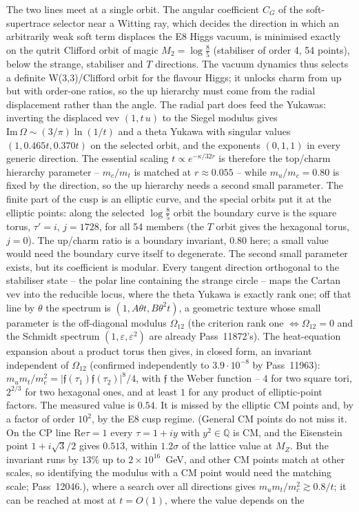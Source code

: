 The two lines meet at a single orbit. The angular coefficient $C_G$ of the soft-supertrace selector near a Witting ray, which decides the direction in which an arbitrarily weak soft term displaces the E8 Higgs vacuum, is minimised exactly on the qutrit Clifford orbit of magic $M_2=\log\tfrac85$ (stabiliser of order 4, 54 points), below the strange, stabiliser and $T$ directions. The vacuum dynamics thus selects a definite W(3,3)/Clifford orbit for the flavour Higgs; it unlocks charm from up but with order-one ratios, so the up hierarchy must come from the radial displacement rather than the angle.  The radial part does feed the Yukawas: inverting the displaced vev $(1,t\,u)$ to the Siegel modulus gives $\mathrm{Im}\,\Omega\sim(3/\pi)\ln(1/t)$ and a theta Yukawa with singular values $(1,0.465t,0.370t)$ on the selected orbit, and the exponents $(0,1,1)$ in every generic direction. The essential scaling $t\propto e^{-\kappa/32r}$ is therefore the top/charm hierarchy parameter -- $m_c/m_t$ is matched at $r\approx0.055$ -- while $m_u/m_c=0.80$ is fixed by the direction, so the up hierarchy needs a second small parameter.  The finite part of the cusp is an elliptic curve, and the special orbits put it at the elliptic points: along the selected $\log\tfrac85$ orbit the boundary curve is the square torus, $\tau'=i$, $j=1728$, for all 54 members (the $T$ orbit gives the hexagonal torus, $j=0$). The up/charm ratio is a boundary invariant, $0.80$ here; a small value would need the boundary curve itself to degenerate.  The second small parameter exists, but its coefficient is modular. Every tangent direction orthogonal to the stabiliser state -- the polar line containing the strange circle -- maps the Cartan vev into the reducible locus, where the theta Yukawa is exactly rank one; off that line by $\theta$ the spectrum is $(1,A\theta t,B\theta^2t)$, a geometric texture whose small parameter is the off-diagonal modulus $\Omega_{12}$ (the criterion rank one $\Leftrightarrow\Omega_{12}=0$ and the Schmidt spectrum $(1,\varepsilon,\varepsilon^2)$ are already Pass~11872's). The heat-equation expansion about a product torus then gives, in closed form, an invariant independent of $\Omega_{12}$ (confirmed independently to $3.9\cdot10^{-8}$ by Pass~11963): $m_um_t/m_c^2=|\mathfrak f(\tau_1)\mathfrak f(\tau_2)|^8/4$, with $\mathfrak f$ the Weber function -- $4$ for two square tori, $2^{2/3}$ for two hexagonal ones, and at least $1$ for any product of elliptic-point factors. The measured value is $0.54$. It is missed by the elliptic CM points and, by a factor of order $10^2$, by the E8 cusp regime. (General CM points do not miss it. On the CP line $\mathrm{Re}\tau=1$ every $\tau=1+iy$ with $y^2\in\mathbb Q$ is CM, and the Eisenstein point $1+i\sqrt3/2$ gives $0.513$, within $1.2\sigma$ of the lattice value at $M_Z$. But the invariant runs by $13\%$ up to $2\times10^{16}$~GeV, and other CM points match at other scales, so identifying the modulus with a CM point would need the matching scale; Pass~12046.), where a search over all directions gives $m_um_t/m_c^2\gtrsim0.8/t$; it can be reached at most at $t=O(1)$, where the value depends on the 